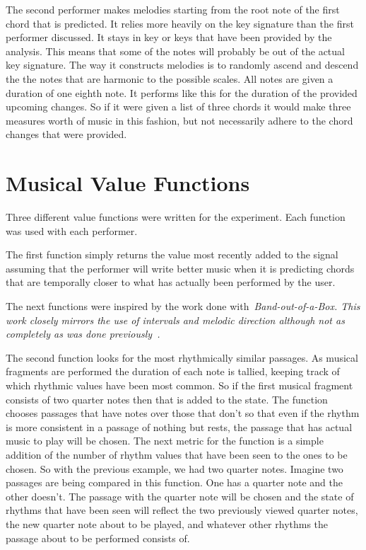 \documentclass[12pt]{ucthesis}
\begin{document}
The second performer makes melodies starting from the root note of the first chord that is predicted. It relies more heavily on the key signature than the first performer discussed. It stays in key or keys that have been provided by the analysis. This means that some of the notes will probably be out of the actual key signature. The way it constructs melodies is to randomly ascend and descend the the notes that are harmonic to the possible scales. All notes are given a duration of one eighth note. It performs like this for the duration of the provided upcoming changes. So if it were given a list of three chords it would make three measures worth of music in this fashion, but not necessarily adhere to the chord changes that were provided.

\section{Musical Value Functions}
\label {musical-value-functions}
Three different value functions were written for the experiment. Each function was used with each performer. 

The first function simply returns the value most recently added to the signal assuming that the performer will write better music when it is predicting chords that are temporally closer to what has actually been performed by the user.  

The next functions were inspired by the work done with~\em{Band-out-of-a-Box. }\em This work closely mirrors the use of intervals and melodic direction although not as completely as was done previously~\cite{bob}.

The second function looks for the most rhythmically similar passages. As musical fragments are performed the duration of each note is tallied, keeping track of which rhythmic values have been most common. So if the first musical fragment consists of two quarter notes then that is added to the state. The function chooses passages that have notes over those that don't so that even if the rhythm is more consistent in a passage of nothing but rests, the passage that has actual music to play will be chosen. The next metric for the function is a simple addition of the number of rhythm values that have been seen to the ones to be chosen. So with the previous example, we had two quarter notes. Imagine two passages are being compared in this function. One has a quarter note and the other doesn't. The passage with the quarter note will be chosen and the state of rhythms that have been seen will reflect the two previously viewed quarter notes, the new quarter note about to be played, and whatever other rhythms the passage about to be performed consists of.
\end{document}
